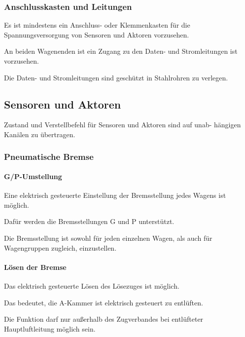 \subsubsection{Anschlusskasten und Leitungen}
\begin{feat}
Es ist mindestens ein Anschluss- oder Klemmenkasten für die Spannungsversorgung von Sensoren und Aktoren vorzusehen. 
\end{feat}
\begin{feat}
An beiden Wagenenden ist ein Zugang zu den Daten- und Stromleitungen ist vorzusehen.
\end{feat}
\begin{feat}
Die Daten- und Stromleitungen sind geschützt in Stahlrohren zu verlegen.
\end{feat}

\subsection{Sensoren und Aktoren}
\begin{feat}
Zustand und Verstellbefehl für Sensoren und Aktoren sind auf unab- hängigen Kanälen zu übertragen.
\end{feat}
\subsubsection{Pneumatische Bremse}
\paragraph{G/P-Umstellung}
\begin{feat}
Eine elektrisch gesteuerte Einstellung der Bremsstellung jedes Wagens ist möglich.
\end{feat}
\begin{rem} [zu Anf. 17]
Dafür werden die Bremsstellungen G und P unterstützt.
\end{rem}
\begin{rem} [zu Anf. 17]
Die Bremsstellung ist sowohl für jeden einzelnen Wagen, als auch für Wagengruppen zugleich, einzustellen.
\end{rem}

\paragraph{Lösen der Bremse}
\begin{feat}
Das elektrisch gesteuerte Lösen des Lösezuges ist möglich.
\end{feat}
\begin{rem}[zu Anf. 18]
Das bedeutet, die A-Kammer ist elektrisch gesteuert zu entlüften.
\end{rem}
\begin{rem}[zu Anf. 18]
Die Funktion darf nur außerhalb des \gls{Zugverband}es bei entlüfteter Hauptluftleitung möglich sein.
\end{rem}

